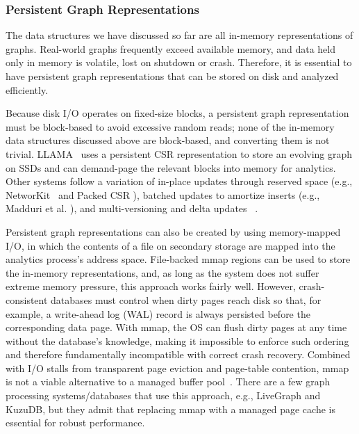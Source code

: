 \subsubsection{Persistent Graph Representations}
\label{sec:bg:persistent}
The data structures we have discussed so far are all in-memory representations of graphs.
Real-world graphs frequently exceed available memory, and data held only in memory is volatile, lost on shutdown or crash.
Therefore, it is essential to have persistent graph representations that can be stored on disk and analyzed efficiently.

Because disk I/O operates on fixed-size blocks, a persistent graph representation must be block-based to avoid excessive random reads; none of the in-memory data structures discussed above are block-based, and converting them is not trivial.
LLAMA~\cite{llama} uses a persistent CSR representation to store an evolving graph on SSDs and can demand-page the relevant blocks into memory for analytics.
Other systems follow a variation of in-place updates through reserved space (e.g., NetworKit~\cite{staudt2014networkit} and Packed CSR \cite{PackedCSR}), batched updates to amortize inserts (e.g., Madduri et al. \cite{madduri2009compact}), and multi-versioning and delta updates ~\cite{csr++2020Firmli,llama}.

 Persistent graph representations can also be created by using memory-mapped I/O, in which the contents of a file on secondary storage are mapped into the analytics process's address space.
File-backed mmap regions can be used to store the in-memory representations, and, as long as the system does not suffer extreme memory pressure, this approach works fairly well.
However, crash-consistent databases must control when dirty pages reach disk so that, for example, a write-ahead log (WAL) record is always persisted before the corresponding data page.
With mmap, the OS can flush dirty pages at any time without the database's knowledge, making it impossible to enforce such ordering and therefore fundamentally incompatible with correct crash recovery.
Combined with I/O stalls from transparent page eviction and page-table contention, mmap is not a viable alternative to a managed buffer pool~\cite{crotty2022you}.
There are a few graph processing systems/databases that use this approach, e.g., LiveGraph\cite{zhu2019livegraph} and KuzuDB\cite{feng2023kuzu}, but they admit that replacing mmap with a managed page cache is essential for robust performance\cite[Section 6]{zhu2019livegraph}.